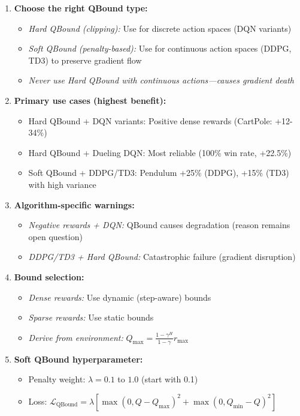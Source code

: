 \documentclass[11pt]{article}
\theoremstyle{definition}
\theoremstyle{remark}
\begin{document}
\begin{enumerate}
    \item \textbf{Choose the right QBound type:}
        \begin{itemize}
            \item \textit{Hard QBound (clipping):} Use for discrete action spaces (DQN variants)
            \item \textit{Soft QBound (penalty-based):} Use for continuous action spaces (DDPG, TD3) to preserve gradient flow
            \item \textit{Never use Hard QBound with continuous actions—causes gradient death}
        \end{itemize}

    \item \textbf{Primary use cases (highest benefit):}
        \begin{itemize}
            \item Hard QBound + DQN variants: Positive dense rewards (CartPole: +12-34\%)
            \item Hard QBound + Dueling DQN: Most reliable (100\% win rate, +22.5\%)
            \item Soft QBound + DDPG/TD3: Pendulum +25\% (DDPG), +15\% (TD3) with high variance
        \end{itemize}

    \item \textbf{Algorithm-specific warnings:}
        \begin{itemize}
            \item \textit{Negative rewards + DQN:} QBound causes degradation (reason remains open question)
            \item \textit{DDPG/TD3 + Hard QBound:} Catastrophic failure (gradient disruption)
        \end{itemize}

    \item \textbf{Bound selection:}
        \begin{itemize}
            \item \textit{Dense rewards:} Use dynamic (step-aware) bounds
            \item \textit{Sparse rewards:} Use static bounds
            \item \textit{Derive from environment:} $Q_{\max} = \frac{1-\gamma^H}{1-\gamma} r_{\max}$
        \end{itemize}

    \item \textbf{Soft QBound hyperparameter:}
        \begin{itemize}
            \item Penalty weight: $\lambda = 0.1$ to $1.0$ (start with 0.1)
            \item Loss: $\mathcal{L}_{\text{QBound}} = \lambda[\max(0, Q-Q_{\max})^2 + \max(0, Q_{\min}-Q)^2]$
        \end{itemize}


\end{enumerate}
\end{document}
